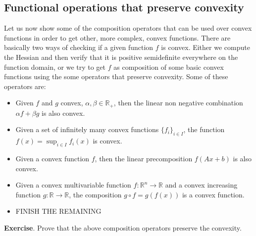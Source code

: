 \subsection{Functional operations that preserve convexity}
\par Let us now show some of the composition operators that can be used over convex functions in order to get other, more complex, convex functions. There are basically two ways of checking if a given function $f$ is convex. Either we compute the Hessian and then verify that it is positive semidefinite everywhere on the function domain, or we try to get $f$ as composition of some basic convex functions using the some operators that preserve convexity. Some of these operators are:
\begin{itemize}
    \item Given $f$ and $g$ convex, $\alpha, \beta \in \mathbb{R}_+$, then the linear non negative combination $\alpha f + \beta g$ is also convex.
    \item Given a set of infinitely many convex functions $\{f_i\}_{i \in I}$, the function $f(x) = \sup_{i \in I} f_i(x)$ is convex.
    \item Given a convex function $f$, then the linear precomposition $f(Ax+b)$ is also convex.
    \item Given a convex multivariable function $f : \mathbb{R}^n \rightarrow \mathbb{R}$ and a convex increasing function $g : \mathbb{R} \rightarrow \mathbb{R}$, the composition $g \circ f = g(f(x))$ is a convex function.
    \item FINISH THE REMAINING
\end{itemize}
\par \textbf{Exercise}. Prove that the above composition operators preserve the convexity.
%
